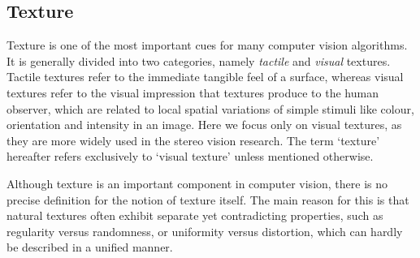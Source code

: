 



\subsection{Texture}
Texture is one of the most important cues for many computer vision algorithms. It is generally divided into two categories, namely \textit{tactile} and \textit{visual} textures. Tactile textures refer to the immediate tangible feel of a surface, whereas visual textures refer to the visual impression that textures produce to the human observer, which are related to local spatial variations of simple stimuli like colour, orientation and intensity in an image. Here we focus only on visual textures, as they are more widely used in the stereo vision research. The term `texture' hereafter refers exclusively to `visual texture' unless mentioned otherwise.

Although texture is an important component in computer vision, there is no precise definition for the notion of texture itself. The main reason for this is that natural textures often exhibit separate yet contradicting properties, such as regularity versus randomness, or uniformity versus distortion, which can hardly be described in a unified manner. 

